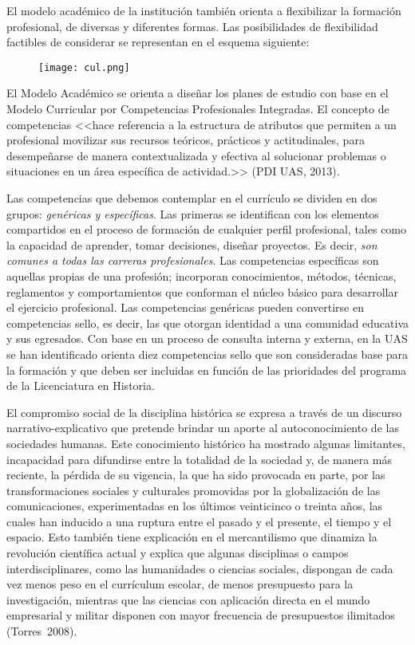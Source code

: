 \medskip
El modelo académico de la institución también orienta a flexibilizar la
formación profesional, de diversas y diferentes formas. Las posibilidades
de flexibilidad  factibles de considerar  se representan en el esquema
siguiente:

\vspace{6pt}
\begin{figure}[H]
\centering
\texttt{[image: cul.png]}
\end{figure}

\medskip
El Modelo Académico se orienta a diseñar los planes de estudio con base en el
Modelo Curricular por Competencias Profesionales Integradas. El concepto de
competencias <<hace referencia a la estructura de atributos que permiten a
un profesional movilizar sus recursos teóricos, prácticos y actitudinales,
para desempeñarse de manera contextualizada y efectiva al solucionar
problemas o situaciones en un área específica de actividad.>> (PDI UAS,
2013).

\enlargethispage{1\baselineskip}
Las competencias que debemos contemplar en el currículo se dividen en dos
grupos: \textit{genéricas y específicas}. Las primeras se
identifican con los elementos compartidos en el proceso de formación de
cualquier perfil profesional, tales como la capacidad de aprender, tomar
decisiones, diseñar proyectos. Es decir, \textit{son
comunes a todas las carreras profesionales}.
Las competencias específicas son aquellas propias de una
profesión; incorporan conocimientos, métodos, técnicas, reglamentos y
comportamientos que conforman el núcleo básico para desarrollar el
ejercicio profesional. Las competencias genéricas pueden convertirse en
competencias sello, es decir, las que otorgan identidad
a una comunidad educativa y sus egresados.  Con base en un proceso de
consulta interna y externa, en la UAS  se han
identificado orienta diez competencias sello que son consideradas base para
la formación y que deben ser incluidas en función de las prioridades del
programa de la Licenciatura en Historia.

El compromiso social de la disciplina histórica se expresa a través de un
discurso narrativo-explicativo que pretende brindar un aporte al
autoconocimiento de las sociedades humanas. Este conocimiento histórico ha
mostrado algunas limitantes, incapacidad para difundirse entre la totalidad
de la sociedad y, de manera más reciente, la pérdida de su vigencia, la que
ha sido provocada en parte, por las transformaciones sociales y culturales
promovidas por la globalización de las comunicaciones, experimentadas en
los últimos veinticinco o treinta años, las cuales han inducido a una
ruptura entre el pasado y el presente, el tiempo y el espacio. Esto también
tiene explicación en el mercantilismo que dinamiza la revolución científica
actual y explica que algunas disciplinas o campos interdisciplinares, como
las humanidades o ciencias sociales, dispongan de cada vez menos peso en el
currículum escolar, de menos presupuesto para la investigación, mientras
que las ciencias con aplicación directa en el mundo empresarial y militar
disponen con mayor frecuencia de presupuestos ilimitados (Torres~2008).

